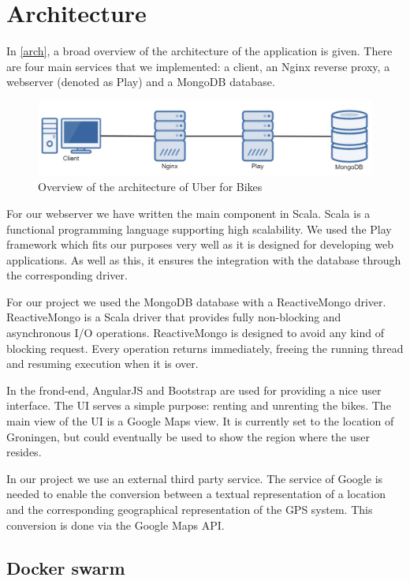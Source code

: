 \section{Architecture}

In \autoref{arch}, a broad overview of the architecture of the application is given. There are four main services that we implemented: a client, an Nginx reverse proxy, a webserver (denoted as Play) and a MongoDB database. 

    \begin{figure}[H]
		\centering
		\includegraphics[width=1.0\textwidth]{images/Architecture.png}
		\caption{Overview of the architecture of Uber for Bikes}
		\label{arch}
	\end{figure}

For our webserver we have written the main component in Scala. Scala is a functional programming language supporting high scalability. We used the Play framework which fits our purposes very well as it is designed for developing web applications.  As well as this, it ensures the integration with the database through the corresponding driver. 

For our project we used the MongoDB database with a ReactiveMongo driver. ReactiveMongo is a Scala driver that provides fully non-blocking and asynchronous I/O operations. ReactiveMongo is designed to avoid any kind of blocking request. Every operation returns immediately, freeing the running thread and resuming execution when it is over.

In the frond-end, AngularJS and Bootstrap are used for providing a nice user interface. The UI serves a simple purpose: renting and unrenting the bikes. The main view of the UI is a Google Maps view. It is currently set to the location of Groningen, but could eventually be used to show the region where the user resides.

In our project we use an external third party service. The service of Google is needed to enable the conversion between a textual representation of a location and the corresponding geographical representation of the GPS system. This conversion is done via the Google Maps API.

\subsection{Docker swarm}

